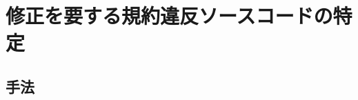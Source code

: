 \documentclass[T,J]{fose} %
\begin{document}









\vspace{-4mm}
\section{修正を要する規約違反ソースコードの特定}\label{sec:approach}
\vspace{-1mm}
\subsection{手法}
\end{document}

